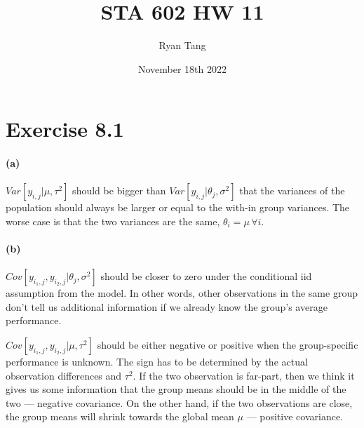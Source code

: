 \documentclass[11pt, letterpaper]{article}
\author{Ryan Tang}
\title{STA 602 HW 11}
\date{November 18th 2022}
\begin{document}
\maketitle

\section{Exercise 8.1}
\paragraph{(a)}
$Var[y_{i,j}|\mu, \tau^2]$ should be bigger than $Var[y_{i,j}|\theta_j, \sigma^2]$ that the variances of the population should always be larger or equal to the with-in group variances. The worse case is that the two variances are the same, $\theta_i=\mu \, \forall i$.

\paragraph{(b)}
$Cov[y_{i_1,j}, y_{i_2, j}|\theta_j, \sigma^2]$ should be closer to zero under the conditional iid assumption from the model. In other words, other observations in the same group don't tell us additional information if we already know the group's average performance.

$Cov[y_{i_1,j}, y_{i_2, j}|\mu, \tau^2]$ should be either negative or positive when the group-specific performance is unknown. The sign has to be determined by the actual observation differences and $\tau^2$. If the two observation is far-part, then we think it gives us some information that the group means should be in the middle of the two --- negative covariance. On the other hand, if the two observations are close, the group means will shrink towards the global mean $\mu$ --- positive covariance.
\end{document}
